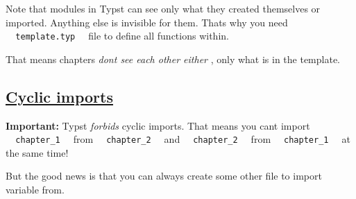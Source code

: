 Note that modules in Typst can see only what they created themselves or
imported. Anything else is invisible for them. That\textquotesingle s
why you need \texttt{\ }{\texttt{\ template.typ\ }}\texttt{\ } file to
define all functions within.

That means chapters \emph{don\textquotesingle t see each other either} ,
only what is in the template.

\subsection{\texorpdfstring{\hyperref[cyclic-imports]{Cyclic
imports}}{Cyclic imports}}\label{cyclic-imports}

\textbf{Important:} Typst \emph{forbids} cyclic imports. That means you
can\textquotesingle t import
\texttt{\ }{\texttt{\ chapter\_1\ }}\texttt{\ } from
\texttt{\ }{\texttt{\ chapter\_2\ }}\texttt{\ } and
\texttt{\ }{\texttt{\ chapter\_2\ }}\texttt{\ } from
\texttt{\ }{\texttt{\ chapter\_1\ }}\texttt{\ } at the same time!

But the good news is that you can always create some other file to
import variable from.

